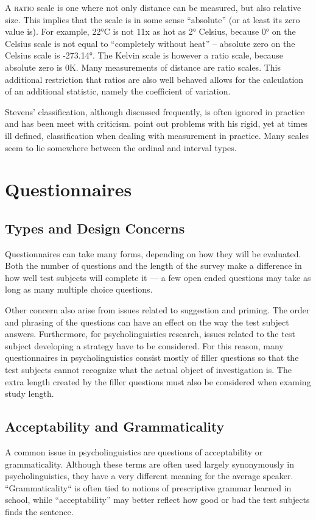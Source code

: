 \documentclass[a4paper,12pt,oneside,leqno]{scrartcl}%
\newcommand{\terminus}[1]{\textsc{#1}}
\begin{document}
A \terminus{ratio} scale is one where not only distance can be measured, but also relative size.  
This implies that the scale is in some sense ``absolute''  (or at least its zero value is). 
For example, 22°C is not 11x as hot as 2° Celsius, because 0° on the Celsius scale is not equal to ``completely without heat'' -- absolute zero on the Celsius scale is -273.14°. 
The Kelvin scale is however a ratio scale, because absolute zero is 0K. 
Many measurements of distance are ratio scales.  
This additional restriction that ratios are also well behaved allows for the calculation of an additional statistic, namely the coefficient of variation.

Stevens' classification, although discussed frequently, is often ignored in practice and has been meet with criticism.  
\citet{vellemanwilkinson1993a} point out problems with his rigid, yet at times ill defined, classification when dealing with measurement in practice.
Many scales seem to lie somewhere between the ordinal and interval  types.
 
\section{Questionnaires}

 \subsection{Types and Design Concerns}
 Questionnaires can take many forms, depending on how they will be evaluated.  
 Both the number of questions and the length of the survey make a difference in how well test subjects will complete it --- a few open ended questions may take as long as many multiple choice questions.  
 
 Other concern also arise from issues related to suggestion and priming.  
 The order and phrasing of the questions can have an effect on the way the test subject answers.  
 Furthermore, for psycholinguistics research, issues related to the test subject developing a strategy have to be considered.  
 For this reason, many questionnaires in psycholinguistics consist mostly of filler questions so that the test subjects cannot recognize what the actual object of investigation is. 
 The extra length created by the filler questions must also be considered when examing study length.

 
 \subsection{Acceptability and Grammaticality}
 A common issue in psycholinguistics are questions of acceptability or grammaticality.
 Although these terms are often used largely synonymously in psycholinguistics, they have a very different meaning for the average speaker.  
``Grammaticality`` is often tied to notions of prescriptive grammar learned in school, while ``acceptability'' may better reflect how good or bad the test subjects finds the sentence. 
 
\end{document}
